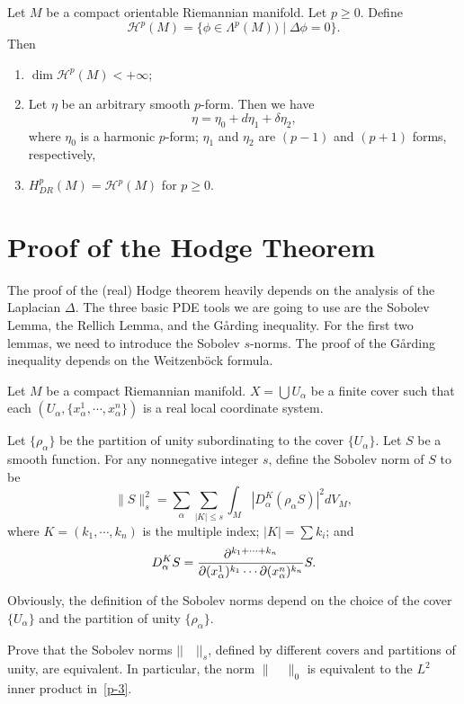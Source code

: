 \begin{theorem} 
Let $M$ be a compact orientable Riemannian manifold. Let $p\geq 0$. Define
\[
\mathcal
H^p(M)=\{\phi\in\Lambda^p(M))\mid \Delta\phi=0\}.
\]
Then
\begin{enumerate}
\item $\dim \mathcal H^p(M)<+\infty$;
\item Let $\eta$ be an arbitrary smooth $p$-form. Then
we have
\[
\eta=\eta_0+d\eta_1+\delta\eta_2,
\]
where $\eta_0$ is a harmonic $p$-form; $\eta_1$ and $\eta_2$
are $(p-1)$ and $(p+1)$ forms, respectively,
\item $H^p_{DR}(M)=\mathcal
H^p(M)$ for $p\geq 0$.
\end{enumerate}
\end{theorem}


\section{Proof of the Hodge Theorem}
The proof of the (real) Hodge theorem heavily
depends on the analysis of the Laplacian
$\Delta$. The three basic PDE
tools we are going to use  are the Sobolev Lemma, the
Rellich Lemma, and the G\aa rding inequality. For the first
two lemmas, we need to introduce the  Sobolev $s$-norms. The
proof of the G\aa rding inequality
depends on the Weitzenb\"ock formula.



Let $M$ be a compact Riemannian manifold.
 $X=\bigcup U_\alpha$ be a  finite cover such that
each $(U_\alpha, \{x_\alpha^1,\cdots, x^{n}_\alpha\})$
is a real  local coordinate system.

Let $\{\rho_\alpha\}$ be the partition of unity subordinating
to the cover $\{U_\alpha\}$. Let $S$ be a smooth
function. For
any nonnegative integer
$s$, define the Sobolev norm of $S$ to be
\[
\|S\|_s^2=\sum_\alpha\sum_{|K|\leq s}\int_M
|D_\alpha^K (\rho_\alpha S)|^2 dV_M,
\]
where $K=(k_1,\cdots,k_{n})$ is the multiple index;
$|K|=\sum k_i$; and
\[
D_\alpha^K S=\frac{\partial^{k_1+\cdots+k_{n}}}{
\partial (x_\alpha^1)^{k_1}\cdots \partial (x_\alpha^{n})^{k_{n}}}
S.
\]

Obviously, the definition of the Sobolev norms depend on
the choice of the cover $\{U_\alpha\}$ and the partition
of unity $\{\rho_\alpha\}$. 

\begin{ex}
Prove that the Sobolev norms
$||\quad||_s$, defined by different covers and partitions
of unity, are equivalent. In particular, the norm $\|\quad\|_0$
is equivalent to the $L^2$ inner product in~\eqref{p-3}.
\end{ex}

